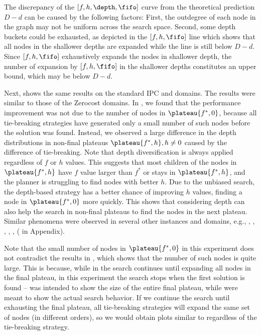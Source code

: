 The discrepancy of the $[f,h,\depth,\fifo]$ curve from the theoretical prediction $D-d$ can be caused by the 
following factors: First, the outdegree of each node in the graph may not be
uniform across the search space. Second, some depth buckets could be
exhausted, as depicted in the  $[f,h,\fifo]$ line which
shows that all nodes in the shallower depths are expanded while the line is still below $D-d$.
Since $[f,h,\fifo]$ exhaustively expands the nodes in shallower depth,
the number of expansion by $[f,h,\fifo]$ in the shallower depths constitutes an upper bound, which may be below $D-d$.

Next,  shows the same results on the standard IPC
 and  domains.
The  results were similar to those of the Zerocost domains.
In ,
we found that the performance improvement was not due to the number of nodes in $\plateau{f^*,0}$,  because all tie-breaking strategies have generated only a small number of such nodes before the solution was found.
Instead, we observed a large difference in the depth distributions in non-final plateaus $\plateau{f^*,h}, h\not=0$ caused by the difference of tie-breaking.
Note that depth diversification is always applied regardless of $f$ or $h$ values.
This suggests that most children of the nodes in $\plateau{f^*,h}$ have $f$ value larger than $f^*$ or stays in $\plateau{f^*,h}$, and the planner is struggling to find nodes with better $h$.
Due to the unbiased search, the depth-based strategy has a better chance of improving $h$ values, finding a node in $\plateau{f^*,0}$ more quickly.
This shows that considering depth can also help the search in non-final plateaus to find the nodes in the next plateau.
Similar phenomena were observed in several other instances and domains, e.g., , , , , ,  ( in Appendix).

Note that the small number of nodes in $\plateau{f^*,0}$ in this experiment does not contradict the results in ,  which shows that  the number of such nodes is quite large.
This is because, while in  the search continues until expanding all nodes in the final plateau, in this experiment the search stops when the first solution is found --   was intended to show the size of the entire final plateau, while  were meant to show the actual search behavior. If we continue the search until exhausting the final plateau, all tie-breaking strategies will expand the same set of nodes (in different orders), so we would obtain plots similar to  regardless of the tie-breaking strategy.

